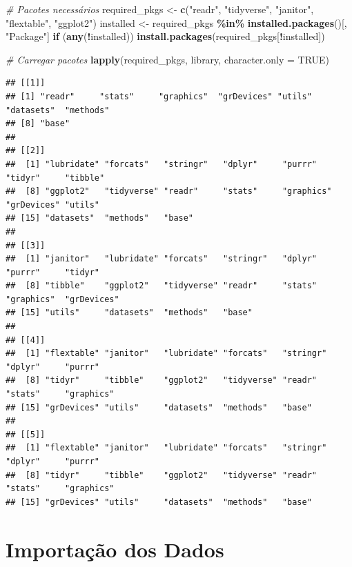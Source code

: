 \documentclass[
]{article}
\newenvironment{Shaded}{\begin{snugshade}}{\end{snugshade}}
\newcommand{\AttributeTok}[1]{\textcolor[rgb]{0.13,0.29,0.53}{#1}}
\newcommand{\CommentTok}[1]{\textcolor[rgb]{0.56,0.35,0.01}{\textit{#1}}}
\newcommand{\ConstantTok}[1]{\textcolor[rgb]{0.56,0.35,0.01}{#1}}
\newcommand{\ControlFlowTok}[1]{\textcolor[rgb]{0.13,0.29,0.53}{\textbf{#1}}}
\newcommand{\FunctionTok}[1]{\textcolor[rgb]{0.13,0.29,0.53}{\textbf{#1}}}
\newcommand{\NormalTok}[1]{#1}
\newcommand{\OtherTok}[1]{\textcolor[rgb]{0.56,0.35,0.01}{#1}}
\newcommand{\SpecialCharTok}[1]{\textcolor[rgb]{0.81,0.36,0.00}{\textbf{#1}}}
\newcommand{\StringTok}[1]{\textcolor[rgb]{0.31,0.60,0.02}{#1}}
\begin{document}
\begin{Shaded}
\begin{Highlighting}[]
\CommentTok{\# Pacotes necessários}
\NormalTok{required\_pkgs }\OtherTok{\textless{}{-}} \FunctionTok{c}\NormalTok{(}\StringTok{"readr"}\NormalTok{, }\StringTok{"tidyverse"}\NormalTok{, }\StringTok{"janitor"}\NormalTok{, }\StringTok{"flextable"}\NormalTok{, }\StringTok{"ggplot2"}\NormalTok{)}
\NormalTok{installed     }\OtherTok{\textless{}{-}}\NormalTok{ required\_pkgs }\SpecialCharTok{\%in\%} \FunctionTok{installed.packages}\NormalTok{()[, }\StringTok{"Package"}\NormalTok{]}
\ControlFlowTok{if}\NormalTok{ (}\FunctionTok{any}\NormalTok{(}\SpecialCharTok{!}\NormalTok{installed)) }\FunctionTok{install.packages}\NormalTok{(required\_pkgs[}\SpecialCharTok{!}\NormalTok{installed])}

\CommentTok{\# Carregar pacotes}
\FunctionTok{lapply}\NormalTok{(required\_pkgs, library, }\AttributeTok{character.only =} \ConstantTok{TRUE}\NormalTok{)}
\end{Highlighting}
\end{Shaded}

\begin{verbatim}
## [[1]]
## [1] "readr"     "stats"     "graphics"  "grDevices" "utils"     "datasets"  "methods"  
## [8] "base"     
## 
## [[2]]
##  [1] "lubridate" "forcats"   "stringr"   "dplyr"     "purrr"     "tidyr"     "tibble"   
##  [8] "ggplot2"   "tidyverse" "readr"     "stats"     "graphics"  "grDevices" "utils"    
## [15] "datasets"  "methods"   "base"     
## 
## [[3]]
##  [1] "janitor"   "lubridate" "forcats"   "stringr"   "dplyr"     "purrr"     "tidyr"    
##  [8] "tibble"    "ggplot2"   "tidyverse" "readr"     "stats"     "graphics"  "grDevices"
## [15] "utils"     "datasets"  "methods"   "base"     
## 
## [[4]]
##  [1] "flextable" "janitor"   "lubridate" "forcats"   "stringr"   "dplyr"     "purrr"    
##  [8] "tidyr"     "tibble"    "ggplot2"   "tidyverse" "readr"     "stats"     "graphics" 
## [15] "grDevices" "utils"     "datasets"  "methods"   "base"     
## 
## [[5]]
##  [1] "flextable" "janitor"   "lubridate" "forcats"   "stringr"   "dplyr"     "purrr"    
##  [8] "tidyr"     "tibble"    "ggplot2"   "tidyverse" "readr"     "stats"     "graphics" 
## [15] "grDevices" "utils"     "datasets"  "methods"   "base"
\end{verbatim}

\section{Importação dos Dados}\label{importacao}
\end{document}
